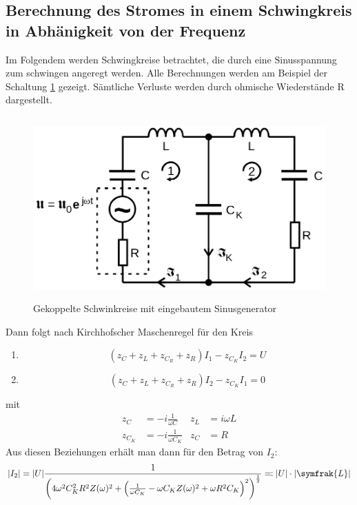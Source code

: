   \subsection{Berechnung des Stromes in einem Schwingkreis in Abhänigkeit von der Frequenz}
  Im Folgendem werden Schwingkreise betrachtet, die durch eine Sinusspannung zum schwingen angeregt werden. Alle Berechnungen werden am Beispiel der Schaltung \ref{fig:Abb4} gezeigt.
  Sämtliche Verluste werden durch ohmische Wiederstände R dargestellt.
  \begin{figure}
    \centering
    \includegraphics[height= 7cm]{./logos/Abb4.png}
    \caption{Gekoppelte Schwinkreise mit eingebautem Sinusgenerator\cite{sample}}
    \label{fig:Abb4}
  \end{figure}
  Dann folgt nach Kirchhofscher Maschenregel  für den Kreis
  \begin{enumerate}
    \item
    \begin{equation}
        (z_C + z_L + z_{C_R} + z_R)I_1 - z_{C_K} I_2 = U
        \label{eqn:U1}
    \end{equation}
      \item
      \begin{equation}
          (z_C + z_L + z_{C_R} + z_R)I_2 - z_{C_K} I_1 = 0
          \label{eqn:U2}
      \end{equation}

  \end{enumerate}
  mit
  \begin{align*}
    z_C & =  -i \frac{1}{\omega C} & z_L & =  i\omega L \\
    z_{C_K} & = -i \frac{1}{\omega C_K} &  z_C & =  R
  \end{align*}
Aus diesen Beziehungen erhält man dann für den Betrag von $I_2$:
\begin{equation}
  \lvert I_2 \rvert = \lvert U \rvert \frac{1}{\left( 4\omega^2 C_{K}^2 R^2 Z(\omega)^2 + \left( \frac{1}{\omega C_K}-\omega C_K Z(\omega)^2 + \omega R^2 C_K\right)^2 \right)^{\frac{1}{2}}}
  \eqcolon \lvert U \rvert \cdot \lvert \symfrak{L} \rvert
  \label{eqn:UL}
\end{equation}
